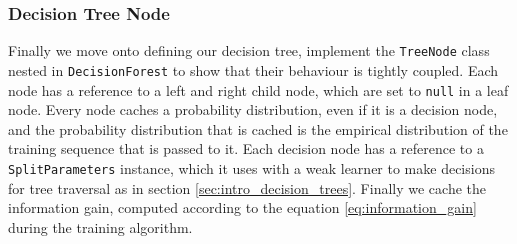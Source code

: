\documentclass[12pt,twoside,notitlepage]{report}
\begin{document}
            \subsubsection{Decision Tree Node}
                Finally we move onto defining our decision tree, implement the \texttt{TreeNode} class nested in 
                \texttt{DecisionForest} to show that their behaviour is tightly coupled. Each node has a reference 
                to a left and right child node, which are set to \texttt{null} in a leaf node. Every node caches a 
                probability distribution, even if it is a decision node, and the 
                probability distribution that is cached is the empirical distribution of the training sequence that is 
                passed to it. Each decision node has a reference to a \texttt{SplitParameters} instance, which it 
                uses with a weak learner to make decisions for tree traversal as in section 
                \ref{sec:intro_decision_trees}. Finally we cache the information gain, computed according to the 
                equation \ref{eq:information_gain} during the training algorithm.
\end{document}
